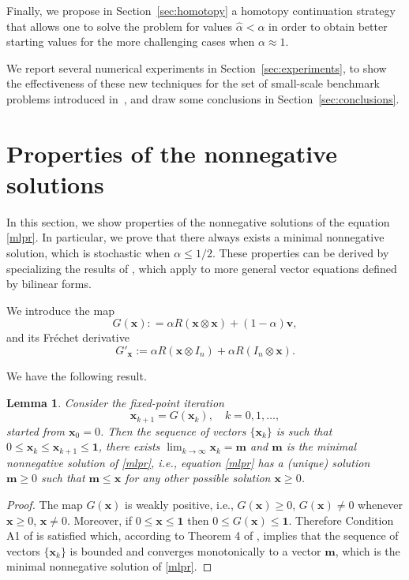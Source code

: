 \documentclass[10pt]{paper}
\newtheorem{lemma}[theorem]{Lemma}
\begin{document}
Finally, we propose in Section~\ref{sec:homotopy} a homotopy continuation strategy that allows one to solve the problem for values $\hat{\alpha} < \alpha$ in order to obtain better starting values for the more challenging cases when $\alpha \approx 1$.

We report several numerical experiments in Section~\ref{sec:experiments}, to show the effectiveness of these new techniques for the set of small-scale benchmark problems introduced in~\cite{GleLY15}, and draw some conclusions in Section~\ref{sec:conclusions}.

\section{Properties of the nonnegative solutions} \label{sec:properties}

In this section, we show properties of the nonnegative solutions of the equation \eqref{mlpr}. In particular, we prove that there always exists a minimal nonnegative solution, which is stochastic when $\alpha\le 1/2$.
These properties can be derived by specializing the results of \cite{Pol13}, which apply to more general vector equations defined by bilinear forms.

We introduce the map 
\[
G({\mathbf{x}}) : = \alpha R({\mathbf{x}} \otimes {\mathbf{x}}) + (1-\alpha) {\mathbf{v}},
\]
and its Fr\'echet derivative 
\[
G'_{\mathbf{x}} := \alpha R({\mathbf{x}} \otimes I_n) + \alpha R(I_n \otimes {\mathbf{x}}).
\]

We have the following result.
\begin{lemma}
	Consider the fixed-point iteration
	\begin{equation} \label{fp}
		{\mathbf{x}}_{k+1} = G({\mathbf{x}}_k), \quad k=0,1,\dots,
	\end{equation}
	started from ${\mathbf{x}}_0=0$. Then the sequence of vectors 
	$\{{\mathbf{x}}_k\}$ is such that $0\le {\mathbf{x}}_k\le {\mathbf{x}}_{k+1}\le {\mathbf{1}}$, there exists $\lim_{k\to\infty}{\mathbf{x}}_k={\mathbf{m}}$ and 
${\mathbf{m}}$ is the minimal nonnegative solution of \eqref{mlpr}, i.e., equation \eqref{mlpr} has a (unique) solution ${\mathbf{m}}\geq 0$ such that ${\mathbf{m}} \leq {\mathbf{x}}$ for any other possible solution ${\mathbf{x}}\geq 0$. 
\end{lemma}

\begin{proof}
The map $G({\mathbf{x}})$ is weakly positive, i.e., $G({\mathbf{x}})\ge 0$, $G({\mathbf{x}})\ne 0$ whenever ${\mathbf{x}}\ge0$,   ${\mathbf{x}}\ne0$. Moreover, if $0\le {\mathbf{x}}\le{\mathbf{1}}$ then $0\le G({\mathbf{x}})\le{\mathbf{1}}$. Therefore Condition A1 of \cite{Pol13} is satisfied which, according to Theorem 4 of \cite{Pol13},  implies that the sequence of vectors 
	$\{{\mathbf{x}}_k\}$ is bounded and converges monotonically to a vector ${\mathbf{m}}$, which is the minimal nonnegative solution of \eqref{mlpr}.
\end{proof}
\end{document}
